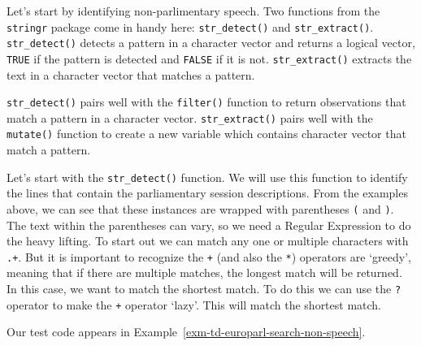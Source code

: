 \documentclass[
  letterpaper,
  DIV=11,
  numbers=noendperiod]{scrreport}
\theoremstyle{definition}
\theoremstyle{remark}
\begin{document}
Let's start by identifying non-parlimentary speech. Two functions from
the \texttt{stringr} package come in handy here: \texttt{str\_detect()}
and \texttt{str\_extract()}. \texttt{str\_detect()} detects a pattern in
a character vector and returns a logical vector, \texttt{TRUE} if the
pattern is detected and \texttt{FALSE} if it is not.
\texttt{str\_extract()} extracts the text in a character vector that
matches a pattern.

\texttt{str\_detect()} pairs well with the \texttt{filter()} function to
return observations that match a pattern in a character vector.
\texttt{str\_extract()} pairs well with the \texttt{mutate()} function
to create a new variable which contains character vector that match a
pattern.

Let's start with the \texttt{str\_detect()} function. We will use this
function to identify the lines that contain the parliamentary session
descriptions. From the examples above, we can see that these instances
are wrapped with parentheses \texttt{(} and \texttt{)}. The text within
the parentheses can vary, so we need a Regular Expression to do the
heavy lifting. To start out we can match any one or multiple characters
with \texttt{.+}. But it is important to recognize the \texttt{+} (and
also the \texttt{*}) operators are `greedy', meaning that if there are
multiple matches, the longest match will be returned. In this case, we
want to match the shortest match. To do this we can use the \texttt{?}
operator to make the \texttt{+} operator `lazy'. This will match the
shortest match.

Our test code appears in
Example~\ref{exm-td-europarl-search-non-speech}.
\end{document}
